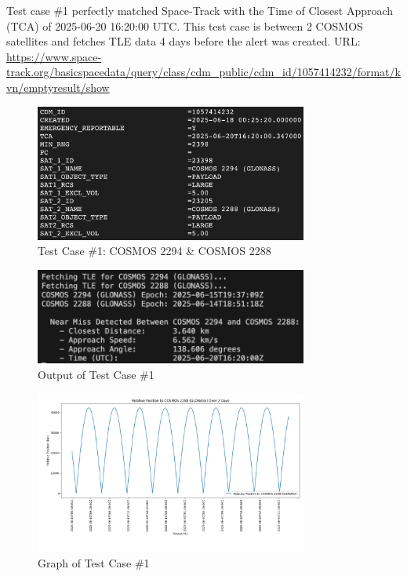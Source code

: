 \documentclass[12pt]{report}
\begin{document}
\begin{enumerate}
  Test case \#1 perfectly matched Space-Track with the Time of Closest Approach (TCA) of 2025-06-20 16:20:00 UTC. This test case is between 2 COSMOS satellites and fetches TLE data 4 days before the alert was created.
  \newline
  URL: \url{https://www.space-track.org/basicspacedata/query/class/cdm_public/cdm_id/1057414232/format/kvn/emptyresult/show}
  \newline
  \begin{figure}[H]
    \centering
    \includegraphics[width=0.8\textwidth]{figure_week_5_test1.png}
    \caption{Test Case \#1: COSMOS 2294 \& COSMOS 2288}
    \label{fig:test_case_1}
  \end{figure}

  \begin{figure}[H]
    \centering
    \includegraphics[width=0.8\textwidth]{figure_week_5_test1-output.png}
    \caption{Output of Test Case \#1}
    \label{fig:test_case_1_output}
  \end{figure}

  \begin{figure}[H]
    \centering
    \includegraphics[width=0.8\textwidth]{figure_week_5_test1-graph.png}
    \caption{Graph of Test Case \#1}
    \label{fig:test_case_1_graph}
  \end{figure}


\end{enumerate}
\end{document}
